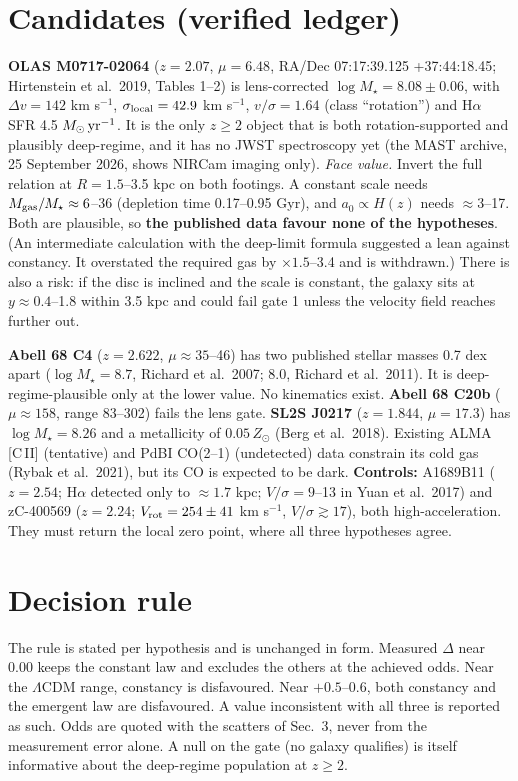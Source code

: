 \documentclass[11pt,letterpaper]{article}
\begin{document}
\section{Candidates (verified ledger)}
\textbf{OLAS M0717-02064} ($z=2.07$, $\mu=6.48$, RA/Dec 07:17:39.125 +37:44:18.45; Hirtenstein et al.\ 2019,
Tables 1--2) is lens-corrected $\log M_\star=8.08\pm0.06$, with $\Delta v=142$ km s$^{-1}$,
$\sigma_{\rm local}=42.9$ km s$^{-1}$, $v/\sigma=1.64$ (class ``rotation'') and H$\alpha$ SFR 4.5
$M_\odot\,{\rm yr^{-1}}$. It is the only $z\geq2$ object that is both rotation-supported and plausibly
deep-regime, and it has no JWST spectroscopy yet (the MAST archive, 25 September 2026, shows NIRCam imaging only).
\emph{Face value.} Invert the full relation at $R=1.5$--3.5 kpc on both footings. A constant scale needs
$M_{\rm gas}/M_\star\approx6$--36 (depletion time 0.17--0.95 Gyr), and $a_0\propto H(z)$ needs $\approx3$--17.
Both are plausible, so \textbf{the published data favour none of the hypotheses}. (An intermediate calculation
with the deep-limit formula suggested a lean against constancy. It overstated the required gas by
$\times1.5$--3.4 and is withdrawn.) There is also a risk: if the disc is inclined and the scale is constant, the
galaxy sits at $y\approx0.4$--1.8 within 3.5 kpc and could fail gate 1 unless the velocity field reaches further
out.

\textbf{Abell 68 C4} ($z=2.622$, $\mu\approx35$--46) has two published stellar masses 0.7 dex apart
($\log M_\star=8.7$, Richard et al.\ 2007; $8.0$, Richard et al.\ 2011). It is deep-regime-plausible only at the
lower value. No kinematics exist. \textbf{Abell 68 C20b} ($\mu\approx158$, range 83--302) fails the lens gate.
\textbf{SL2S J0217} ($z=1.844$, $\mu=17.3$) has $\log M_\star=8.26$ and a metallicity of $0.05\,Z_\odot$ (Berg et al.\
2018). Existing ALMA [C\,II] (tentative) and PdBI CO(2--1) (undetected) data constrain its cold gas (Rybak et al.\
2021), but its CO is expected to be dark. \textbf{Controls:} A1689B11 ($z=2.54$; H$\alpha$ detected only to
$\approx1.7$ kpc; $V/\sigma=9$--13 in Yuan et al.\ 2017) and zC-400569 ($z=2.24$; $V_{\rm rot}=254\pm41$ km
s$^{-1}$, $V/\sigma\gtrsim17$), both high-acceleration. They must return the local zero point, where all three
hypotheses agree.

\section{Decision rule}
The rule is stated per hypothesis and is unchanged in form. Measured $\Delta$ near $0.00$ keeps the constant law
and excludes the others at the achieved odds. Near the $\Lambda$CDM range, constancy is disfavoured. Near
$+0.5$--$0.6$, both constancy and the emergent law are disfavoured. A value inconsistent with all three is reported
as such. Odds are quoted with the scatters of Sec.~3, never from the measurement error alone. A null on the gate
(no galaxy qualifies) is itself informative about the deep-regime population at $z\geq2$.
\end{document}
